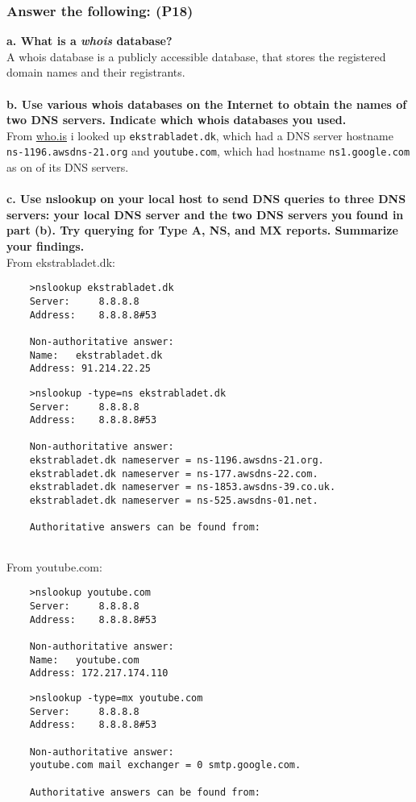 \subsubsection{Answer the following: (P18)}

\textbf{a. What is a \textit{whois} database?} \\
A whois database is a publicly accessible database, that stores the registered domain names and their registrants.\\
\\
\textbf{b. Use various whois databases on the Internet to obtain the names of two DNS servers. Indicate which whois databases you used.} \\
From \url{who.is} i looked up \texttt{ekstrabladet.dk}, which had a DNS server hostname \texttt{ns-1196.awsdns-21.org} and \texttt{youtube.com}, which had hostname \texttt{ns1.google.com} as on of its DNS servers. \\
\\
\textbf{c. Use nslookup on your local host to send DNS queries to three DNS servers: your local DNS server and the two DNS servers you found in part (b). Try querying for Type A, NS, and MX reports. Summarize your findings.} \\
From ekstrabladet.dk:
\begin{verbatim}
    >nslookup ekstrabladet.dk
    Server:		8.8.8.8
    Address:	8.8.8.8#53
    
    Non-authoritative answer:
    Name:	ekstrabladet.dk
    Address: 91.214.22.25
\end{verbatim}
\begin{verbatim}
    >nslookup -type=ns ekstrabladet.dk         
    Server:		8.8.8.8
    Address:	8.8.8.8#53
    
    Non-authoritative answer:
    ekstrabladet.dk	nameserver = ns-1196.awsdns-21.org.
    ekstrabladet.dk	nameserver = ns-177.awsdns-22.com.
    ekstrabladet.dk	nameserver = ns-1853.awsdns-39.co.uk.
    ekstrabladet.dk	nameserver = ns-525.awsdns-01.net.
    
    Authoritative answers can be found from:
    
\end{verbatim}
From youtube.com:
\begin{verbatim}
    >nslookup youtube.com
    Server:		8.8.8.8
    Address:	8.8.8.8#53
    
    Non-authoritative answer:
    Name:	youtube.com
    Address: 172.217.174.110
\end{verbatim}
\begin{verbatim}
    >nslookup -type=mx youtube.com    
    Server:		8.8.8.8
    Address:	8.8.8.8#53
    
    Non-authoritative answer:
    youtube.com	mail exchanger = 0 smtp.google.com.
    
    Authoritative answers can be found from:
    
\end{verbatim}
